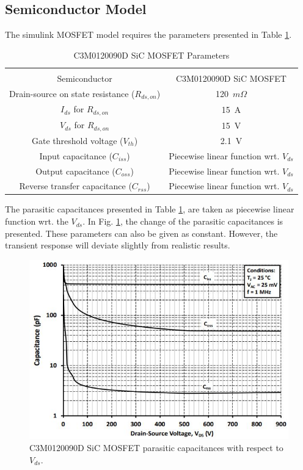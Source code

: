 \documentclass[12pt]{article} %
\begin{document}
\subsection{Semiconductor Model}
The simulink MOSFET model requires the parameters presented in Table \ref{tab:semiconductorparameters}.
\begin{table}[h]
\centering
\caption{C3M0120090D SiC MOSFET Parameters}
\label{tab:semiconductorparameters}
\begin{tabular}{cc}
\hline \\
Semiconductor      &   C3M0120090D SiC MOSFET   \\
Drain-source on state resistance ($R_{ds,on}$)      &   120~$m\Omega$    \\
$I_{ds}$ for $R_{ds,on}$    &   15~A    \\
$V_{ds}$ for $R_{ds,on}$   &   15~V    \\
Gate threshold voltage ($V_{th}$)   &   2.1~V   \\
Input capacitance ($C_{iss}$) & Piecewise linear function wrt. $V_{ds}$\\
Output capacitance ($C_{oss}$) & Piecewise linear function wrt. $V_{ds}$\\
Reverse transfer capacitance ($C_{rss}$) &Piecewise linear function wrt. $V_{ds}$ \\
\hline
\end{tabular}
\end{table}

The parasitic capacitances presented in Table \ref{tab:semiconductorparameters}, are taken as piecewise linear function wrt. the $V_{ds}$. In Fig. \ref{fig:parasiticcapacitance}, the change of the parasitic capacitances is presented. These parameters can also be given as constant. However, the transient response will deviate slightly from realistic results.

\begin{figure}[h!]
\centering	\includegraphics[scale=0.6]{figures/Parasitic_capacitance.JPG}
	\caption{C3M0120090D SiC MOSFET parasitic capacitances with respect to $V_{ds}$.\cite{Cree} }
	\label{fig:parasiticcapacitance}
\end{figure}
\clearpage
\end{document}
